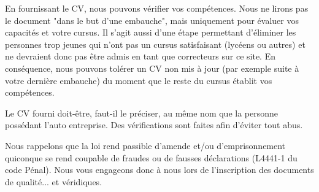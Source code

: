 ﻿En fournissant le CV, nous pouvons vérifier vos compétences.
Nous ne lirons pas le document "dans le but d'une embauche", mais uniquement pour évaluer vos capacités et votre cursus. Il s'agit aussi d'une étape permettant d'éliminer les personnes trop jeunes qui n'ont pas un cursus satisfaisant (lycéens ou autres) et ne devraient donc pas être admis en tant que correcteurs sur ce site.
En conséquence, nous pouvons tolérer un CV non mis à jour (par exemple suite à votre dernière embauche) du moment que le reste du cursus établit vos compétences.

Le CV fourni doit-être, faut-il le préciser, au même nom que la personne possédant l'auto entreprise. Des vérifications sont faites afin d'éviter tout abus.

Nous rappelons que la loi rend passible d'amende et/ou d'emprisonnement quiconque se rend coupable de fraudes ou de fausses déclarations (L4441-1 du code Pénal). Nous vous engageons donc à nous lors de l'inscription des documents de qualité... et véridiques.